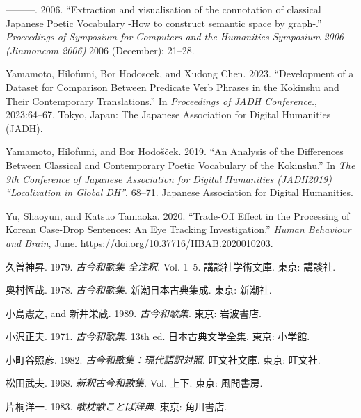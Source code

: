 \documentclass[
  letterpaper,
  DIV=11,
  numbers=noendperiod]{scrartcl}
\newlength{\cslhangindent}
\newenvironment{CSLReferences}[2] %
 {\begin{list}{}{%
  \setlength{\itemindent}{0pt}
  \setlength{\leftmargin}{0pt}
  \setlength{\parsep}{0pt}
  \ifodd #1
   \setlength{\leftmargin}{\cslhangindent}
   \setlength{\itemindent}{-1\cslhangindent}
  \fi
  \setlength{\itemsep}{#2\baselineskip}}}
 {\end{list}}
\begin{document}
\begin{CSLReferences}{1}{0}
---------. 2006. {``{Extraction and visualisation of the connotation of
classical Japanese Poetic Vocabulary -How to construct semantic space by
graph-}.''} \emph{Proceedings of Symposium for Computers and the
Humanities Symposium 2006 (Jinmoncom 2006)} 2006 (December): 21--28.

Yamamoto, Hilofumi, Bor Hodoscek, and Xudong Chen. 2023. {``Development
of a Dataset for Comparison Between Predicate Verb Phrases in the
{Kokinshu} and Their Contemporary Translations.''} In \emph{Proceedings
of {JADH} Conference.}, 2023:64--67. Tokyo, Japan: The Japanese
Association for Digital Humanities (JADH).

Yamamoto, Hilofumi, and Bor Hodošček. 2019. {``An {Analysis} of the
{Differences Between Classical} and {Contemporary Poetic Vocabulary} of
the {Kokinshu}.''} In \emph{The 9th {Conference} of {Japanese
Association} for {Digital Humanities} ({JADH2019}) {``{Localization} in
{Global DH}''}}, 68--71. Japanese Association for Digital Humanities.

Yu, Shaoyun, and Katsuo Tamaoka. 2020. {``Trade-Off Effect in the
Processing of {Korean} Case-Drop Sentences: {An} Eye Tracking
Investigation.''} \emph{Human Behaviour and Brain}, June.
\url{https://doi.org/10.37716/HBAB.2020010203}.

久曽神昇. 1979. \emph{{古今和歌集 全注釈}}. Vol. 1--5. {講談社学術文庫}.
東京: 講談社.

奥村恆哉. 1978. \emph{{古今和歌集}}. {新潮日本古典集成}. 東京: 新潮社.

小島憲之, and 新井栄蔵. 1989. \emph{{古今和歌集}}. 東京: 岩波書店.

小沢正夫. 1971. \emph{{古今和歌集}}. 13th ed. {日本古典文学全集}. 東京:
小学館.

小町谷照彦. 1982. \emph{古今和歌集：現代語訳対照}. 旺文社文庫. 東京:
旺文社.

松田武夫. 1968. \emph{新釈古今和歌集}. Vol. 上下. 東京: 風間書房.

片桐洋一. 1983. \emph{歌枕歌ことば辞典}. 東京: 角川書店.


\end{CSLReferences}
\end{document}
